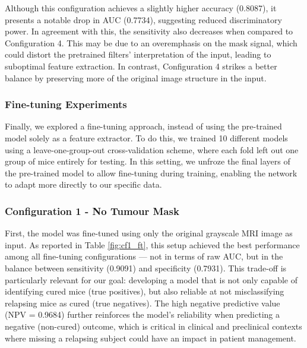 \documentclass[12pt, a4paper]{report}
\begin{document}
\begin{table}[H]
\centering
{}
\caption{Configuration 5: ImageNet Weights, Mask on the 2nd and 3rd channel}
\label{tab:cf5}
\end{table}

Although this configuration achieves a slightly higher accuracy (0.8087), it presents a notable drop in AUC (0.7734), suggesting reduced discriminatory power. In agreement with this, the sensitivity also decreases when compared to Configuration 4. This may be due to an overemphasis on the mask signal, which could distort the pretrained filters’ interpretation of the input, leading to suboptimal feature extraction. In contrast, Configuration 4 strikes a better balance by preserving more of the original image structure in the input.

\subsubsection{Fine-tuning Experiments}

Finally, we explored a fine-tuning approach, instead of using the pre-trained model solely as a feature extractor. To do this, we trained 10 different models using a leave-one-group-out cross-validation scheme, where each fold left out one group of mice entirely for testing. In this setting, we unfroze the final layers of the pre-trained model to allow fine-tuning during training, enabling the network to adapt more directly to our specific data.

\subsubsection{Configuration 1 - No Tumour Mask}

First, the model was fine-tuned using only the original grayscale MRI image as input. As reported in Table \ref{fig:cf1_ft}, this setup achieved the best performance among all fine-tuning configurations — not in terms of raw AUC, but in the balance between sensitivity (0.9091) and specificity (0.7931). This trade-off is particularly relevant for our goal: developing a model that is not only capable of identifying cured mice (true positives), but also reliable at not misclassifying relapsing mice as cured (true negatives). The high negative predictive value (NPV = 0.9684) further reinforces the model's reliability when predicting a negative (non-cured) outcome, which is critical in clinical and preclinical contexts where missing a relapsing subject could have an impact in patient management.
\end{document}

